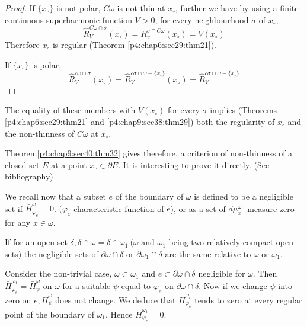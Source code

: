\begin{proof} %
  If $\{x_\circ\}$ is not polar, $C \omega$ is not thin at $x_\circ$, further
  we have by using a finite continuous superharmonic function $V > 0$,
  for every neighbourhood $\sigma$ of $x_\circ$, 
  $$
  \hat{R}^{C \omega \cap \sigma}_V (x_\circ) = R_v^{\sigma \cap C \omega}
  (x_\circ) = V (x_\circ) 
  $$
  Therefore $x_\circ$ is regular (Theorem \ref{p4:chap6:sec29:thm21}).

  If $\{x_\circ\}$ is polar,
  $$
  \hat{R}^{c \omega \cap \sigma}_V (x_\circ) = \hat{R}^{c \sigma \cap
    \omega - \{x_\circ\}}_V (x_\circ) = \hat{R}^{c \sigma \cap \omega -
    \{x_\circ\}}_V  
  $$
\end{proof} 

The equality of these members with $V (x_\circ)$ for every $\sigma$
implies (Theorems \ref{p4:chap6:sec29:thm21}
and \ref{p4:chap9:sec38:thm29}) both the regularity of $x_\circ$ and the
non-thinness of $C \omega$ at $x_\circ$. 

\begin{remark*} %
  Theorem\pageoriginale \ref{p4:chap9:sec40:thm32} gives therefore, a
  criterion of non-thinness of a 
  closed set $E$ at a point $x_\circ \in \partial E$. It is interesting to
  prove it directly. (See bibliography)  
\end{remark*}

We recall now that a subset $e$ of the boundary of $\omega$ is defined
to be a negligible set if $\bar{H}^\omega_{\varphi_e} = 0$.
$(\varphi_ \varepsilon$ characteristic function of $e$), or as a set
of $d \mu^\omega_x$- measure zero for any $x \in \omega$. 

\begin{lemma*} %
  If for an open set $\delta, \delta \cap \omega = \delta \cap
  \omega_1 ~ (\omega$ and $\omega_1$ being two relatively compact open
  sets) the negligible sets of $\partial \omega \cap \delta$ or
  $\partial \omega_1 \cap \delta$ are the same relative to $\omega$ or
  $\omega_1$. 
\end{lemma*}

Consider the non-trivial case, $\omega \subset \omega_1$ and $e
\subset \partial \omega \cap \delta$ negligible for $\omega$. Then
$\bar{H}^{\omega_1}_{\varphi_e} = \bar{H}^\omega_\psi$ on $\omega$ for
a suitable $\psi$ equal to $\varphi_e$ on $\partial \omega \cap
\delta$. Now if we change $\psi$ into zero  on $e,
\bar{H}^\omega_\psi$ does not change. We deduce that
$\bar{H}^{\omega_i}_{\varphi_e}$ tends to zero at every regular point
of the boundary of $\omega_1$. Hence $\bar{H}^{\omega_1}_{\varphi_e}=
0$. 

